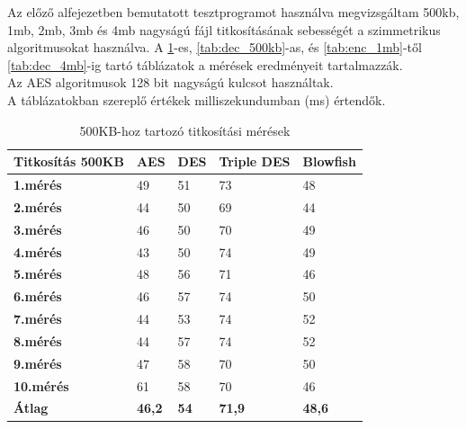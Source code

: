 \noindent Az előző alfejezetben bemutatott tesztprogramot használva megvizsgáltam 500kb, 1mb, 2mb, 3mb és 4mb nagyságú fájl titkosításának sebességét a szimmetrikus algoritmusokat használva. A \ref{tab:enc_500kb}-es, \ref{tab:dec_500kb}-as, és \ref{tab:enc_1mb}-től \ref{tab:dec_4mb}-ig tartó táblázatok a mérések eredményeit tartalmazzák.
\noindent \\ Az AES algoritmusok 128 bit nagyságú kulcsot használtak. \\A táblázatokban szereplő értékek milliszekundumban (ms) értendők.
\vspace{5pt}
\begin{table}[H]
	\centering
	\caption{500KB-hoz tartozó titkosítási mérések}
	\label{tab:enc_500kb}
	\medskip
	\begin{tabular}{|p{2.4cm}|p{2cm}|p{2cm}|p{2cm}|p{2cm}|}
		\hline
		\textbf{Titkosítás} \newline \textbf{500KB} & \textbf{AES} & \textbf{DES} & \textbf{Triple DES} & \textbf{Blowfish}\\
		\hline
		\textbf{1.mérés} & 49 & 51 & 73 & 48\\
		\hline
		\textbf{2.mérés} & 44 & 50 & 69 & 44\\
		\hline
		\textbf{3.mérés} & 46 & 50 & 70 & 49\\
		\hline
		\textbf{4.mérés} & 43 & 50 & 74 & 49\\
		\hline
		\textbf{5.mérés} & 48 & 56 & 71 & 46\\
		\hline
		\textbf{6.mérés} & 46 & 57 & 74 & 50\\
		\hline
		\textbf{7.mérés} & 44 & 53 & 74 & 52\\
		\hline
		\textbf{8.mérés} & 44 & 57 & 74 & 52\\
		\hline
		\textbf{9.mérés} & 47 & 58 & 70 & 50\\
		\hline
		\textbf{10.mérés} & 61 & 58 & 70 & 46\\
		\hline
		\hline
		\textbf{Átlag} & \textbf{46,2} & \textbf{54} & \textbf{71,9} & \textbf{48,6}\\
		\hline
	\end{tabular}
\end{table}

